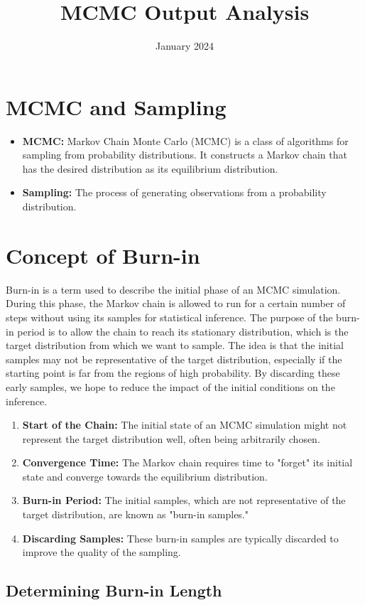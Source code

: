 \documentclass{article}
\title{MCMC Output Analysis}
\date{January 2024}
\begin{document}
\section{MCMC and Sampling}

\begin{itemize}
    \item \textbf{MCMC:} Markov Chain Monte Carlo (MCMC) is a class of algorithms for sampling from probability distributions. It constructs a Markov chain that has the desired distribution as its equilibrium distribution.
    \item \textbf{Sampling:} The process of generating observations from a probability distribution.
\end{itemize}

\section{Concept of Burn-in}
Burn-in is a term used to describe the initial phase of an MCMC simulation. During this phase, the Markov chain is allowed to run for a certain number of steps without using its samples for statistical inference. The purpose of the burn-in period is to allow the chain to reach its stationary distribution, which is the target distribution from which we want to sample. The idea is that the initial samples may not be representative of the target distribution, especially if the starting point is far from the regions of high probability. By discarding these early samples, we hope to reduce the impact of the initial conditions on the inference.

\begin{enumerate}
    \item \textbf{Start of the Chain:} The initial state of an MCMC simulation might not represent the target distribution well, often being arbitrarily chosen.
    \item \textbf{Convergence Time:} The Markov chain requires time to "forget" its initial state and converge towards the equilibrium distribution.
    \item \textbf{Burn-in Period:} The initial samples, which are not representative of the target distribution, are known as "burn-in samples."
    \item \textbf{Discarding Samples:} These burn-in samples are typically discarded to improve the quality of the sampling.
\end{enumerate}

\subsection{Determining Burn-in Length}
\end{document}
